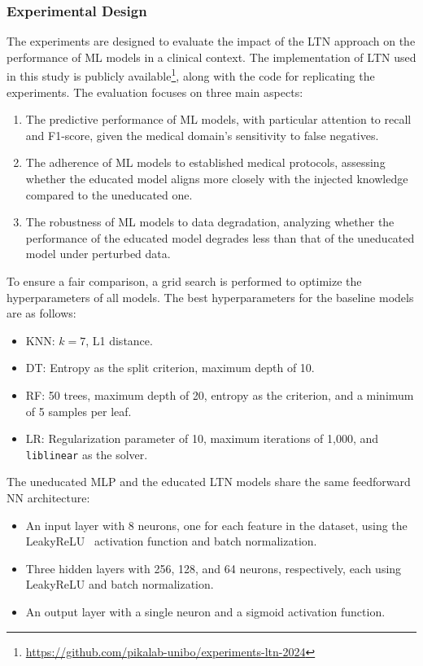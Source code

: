 \subsubsection{Experimental Design}
\label{subsubsec:experimental-design}
%
The experiments are designed to evaluate the impact of the \gls{LTN} approach on the performance of \gls{ML} models in a clinical context.
%
The implementation of \gls{LTN} used in this study is publicly available\footnote{\url{https://github.com/pikalab-unibo/experiments-ltn-2024}}, along with the code for replicating the experiments.
%
The evaluation focuses on three main aspects:
%
\begin{enumerate}
    \item The predictive performance of \gls{ML} models, with particular attention to recall and F1-score, given the medical domain's sensitivity to false negatives.
    \item The adherence of \gls{ML} models to established medical protocols, assessing whether the educated model aligns more closely with the injected knowledge compared to the uneducated one.
    \item The robustness of \gls{ML} models to data degradation, analyzing whether the performance of the educated model degrades less than that of the uneducated model under perturbed data.
\end{enumerate}
%
To ensure a fair comparison, a grid search is performed to optimize the hyperparameters of all models.
%
The best hyperparameters for the baseline models are as follows:
%
\begin{itemize}
    \item \gls{KNN}: \(k = 7\), L1 distance.
    \item \gls{DT}: Entropy as the split criterion, maximum depth of 10.
    \item \gls{RF}: 50 trees, maximum depth of 20, entropy as the criterion, and a minimum of 5 samples per leaf.
    \item \gls{LR}: Regularization parameter of 10, maximum iterations of 1,000, and \texttt{liblinear} as the solver.
\end{itemize}
%
The uneducated \gls{MLP} and the educated \gls{LTN} models share the same feedforward \gls{NN} architecture:
%
\begin{itemize}
    \item An input layer with 8 neurons, one for each feature in the dataset, using the \gls{LeakyReLU}~\cite{maas2013rectifier} activation function and batch normalization.
    \item Three hidden layers with 256, 128, and 64 neurons, respectively, each using \gls{LeakyReLU} and batch normalization.
    \item An output layer with a single neuron and a sigmoid activation function.
\end{itemize}
